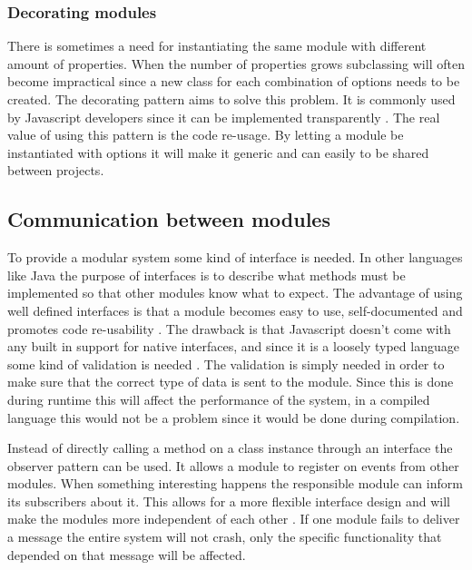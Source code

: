 \subsubsection{Decorating modules}

There is sometimes a need for instantiating the same module with different amount of properties. When the number of properties grows subclassing will often become impractical since a new class for each combination of options needs to be created. The decorating pattern aims to solve this problem. It is commonly used by Javascript developers since it can be implemented transparently \cite[p. 70]{addy_osmani_design_patterns}. The real value of using this pattern is the code re-usage. By letting a module be instantiated with options it will make it generic and can easily to be shared between projects.


\subsection{Communication between modules}
To provide a modular system some kind of interface is needed. In other languages like Java the purpose of interfaces is to describe what methods must be implemented so that other modules know what to expect. The advantage of using well defined interfaces is that a module becomes easy to use, self-documented and promotes code re-usability \cite[p. 65]{addy_osmani_design_patterns}. The drawback is that Javascript doesn't come with any built in support for native interfaces, and since it is a loosely typed language some kind of validation is needed \cite[p. 65]{addy_osmani_design_patterns}. The validation is simply needed in order to make sure that the correct type of data is sent to the module. Since this is done during runtime this will affect the performance of the system, in a compiled language this would not be a problem since it would be done during compilation.

Instead of directly calling a method on a class instance through an interface the observer pattern can be used. It allows a module to register on events from other modules. When something interesting happens the responsible module can inform its subscribers about it. This allows for a more flexible interface design and will make the modules more independent of each other \cite[p. 38]{addy_osmani_design_patterns}. If one module fails to deliver a message the entire system will not crash, only the specific functionality that depended on that message will be affected.

